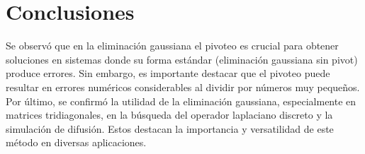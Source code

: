 \section{Conclusiones}
Se observó que en la eliminación gaussiana el pivoteo es crucial para obtener soluciones en sistemas donde su forma estándar (eliminación gaussiana sin pivot) produce errores. Sin embargo, es importante destacar que el pivoteo puede resultar en errores numéricos considerables al dividir por números muy pequeños. 
Por último, se confirmó la utilidad de la eliminación gaussiana, especialmente en matrices tridiagonales, en la búsqueda del operador laplaciano discreto y la simulación de difusión. Estos destacan la importancia y versatilidad de este método en diversas aplicaciones.
